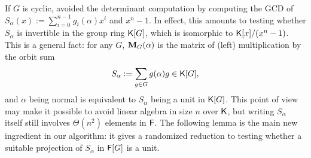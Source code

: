 If $G$ is cyclic, \cite{Giesbrecht} avoided the determinant
computation by computing the GCD of $S_\alpha(x) := \sum_{i = 0}^{n-1}
g_i(\alpha)x^i$ and $x^n-1$. In effect, this amounts to testing
whether $S_\alpha$ is invertible in the group ring ${\mathsf{K}}[G]$, which is
isomorphic to ${\mathsf{K}}[x]/(x^n-1)$. This is a general fact: for any $G$,
$\mat M_G(\alpha)$ is the matrix of (left) multiplication by the orbit
sum
$$S_\alpha:= \sum_{g \in G} g(\alpha)g \in {\mathsf{K}}[G],$$ and $\alpha$ being
normal is equivalent to $S_\alpha$ being a unit in ${\mathsf{K}}[G]$. This point
of view may make it possible to avoid linear algebra in size $n$ over
${\mathsf{K}}$, but writing $S_\alpha$ itself still involves $\Theta(n^2)$
elements in ${\mathsf{F}}$. The following lemma is the main new ingredient 
in our algorithm: it gives a randomized reduction to testing
whether a suitable projection of $S_\alpha$ in ${\mathsf{F}}[G]$ is a unit.
 


